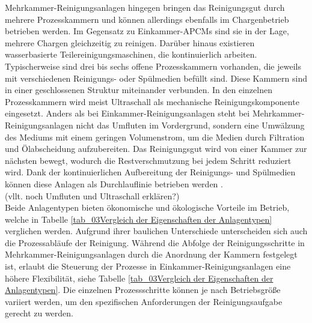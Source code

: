 Mehrkammer-Reinigungsanlagen hingegen bringen das Reinigungsgut durch mehrere Prozesskammern und können allerdings ebenfalls im Chargenbetrieb betrieben werden. Im Gegensatz zu Einkammer-APCMs sind sie in der Lage, mehrere Chargen gleichzeitig zu reinigen. Darüber hinaus existieren wasserbasierte Teilereinigungsmaschinen, die kontinuierlich arbeiten. Typischerweise sind drei bis sechs offene Prozesskammern vorhanden, die jeweils mit verschiedenen Reinigungs- oder Spülmedien befüllt sind. Diese Kammern sind in einer geschlossenen Struktur miteinander verbunden. In den einzelnen Prozesskammern wird meist Ultraschall als mechanische Reinigungskomponente eingesetzt. Anders als bei Einkammer-Reinigungsanlagen steht bei Mehrkammer-Reinigungsanlagen nicht das Umfluten im Vordergrund, sondern eine Umwälzung des Mediums mit einem geringen Volumenstrom, um die Medien durch Filtration und Ölabscheidung aufzubereiten. Das Reinigungsgut wird von einer Kammer zur nächsten bewegt, wodurch die Restverschmutzung bei jedem Schritt reduziert wird. Dank der kontinuierlichen Aufbereitung der Reinigungs- und Spülmedien können diese Anlagen als Durchlauflinie betrieben werden \cite{OekologischeUndOekonomische}.\\ 

(vllt. noch Umfluten und Ultraschall erklären?)\\

Beide Anlagentypen bieten ökonomische und ökologische Vorteile im Betrieb, welche in Tabelle \ref{tab_03Vergleich der Eigenschaften der Anlagentypen} verglichen werden. Aufgrund ihrer baulichen Unterschiede unterscheiden sich auch die Prozessabläufe der Reinigung. Während die Abfolge der Reinigungsschritte in Mehrkammer-Reinigungsanlagen durch die Anordnung der Kammern festgelegt ist, erlaubt die Steuerung der Prozesse in Einkammer-Reinigungsanlagen eine höhere Flexibilität, siehe Tabelle \ref{tab_03Vergleich der Eigenschaften der Anlagentypen}. Die einzelnen Prozessschritte können je nach Betriebsgröße variiert werden, um den spezifischen Anforderungen der Reinigungsaufgabe gerecht zu werden.\\

